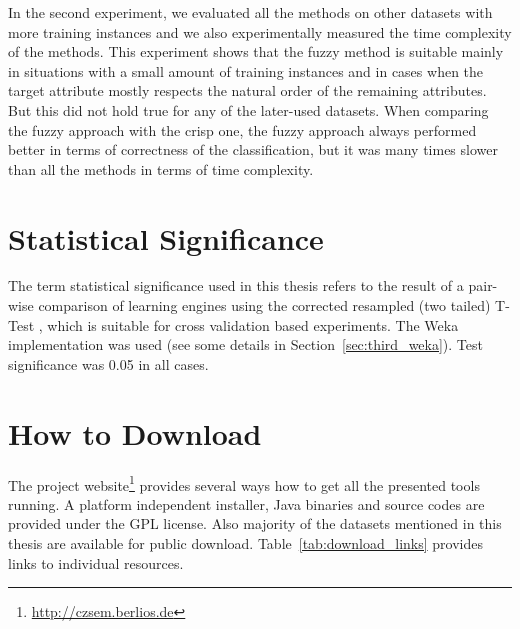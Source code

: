 In the second experiment, we evaluated all the methods on other datasets with more training instances and we also experimentally measured the time complexity of the methods. This experiment shows that the fuzzy method is suitable mainly in situations with a small amount of training instances and in cases when the target attribute mostly respects the natural order of the remaining attributes. But this did not hold true for any of the later-used datasets. When comparing the fuzzy approach with the crisp one, the fuzzy approach always performed better in terms of correctness of the classification, but it was many times slower than all the methods in terms of time complexity.



\section{Statistical Significance} \label{sec:conclusion_statsig}
The term statistical significance used in this thesis refers to the result of a pair-wise comparison of learning engines using the corrected resampled (two tailed) T-Test \citep{Nadeau:2003:IGE:779909.779927}, which is suitable for cross validation based experiments. The Weka implementation was used (see some details in Section~\ref{sec:third_weka}). Test significance was 0.05 in all cases.




\section{How to Download} \label{sec:download_notes}
The project website\footnote{\url{http://czsem.berlios.de}} provides several ways how to get all the presented tools running. A platform independent installer, Java binaries and source codes are provided under the GPL license.
%
Also majority of the datasets mentioned in this thesis are available for public download.
%
Table~\ref{tab:download_links} provides links to individual resources.


